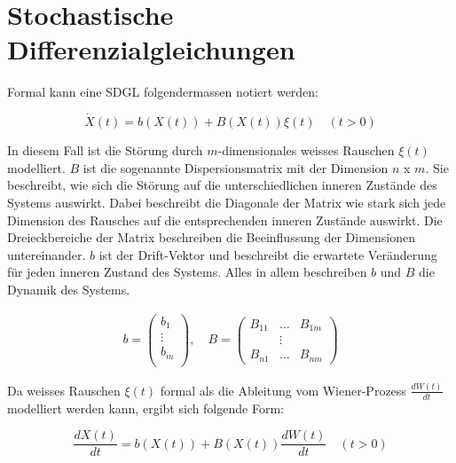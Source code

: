 %
%
%
%

\section{Stochastische Differenzialgleichungen\label{brown:SDGL}}

Formal kann eine SDGL folgendermassen notiert werden: 

\begin{equation}
	\label{brown:SDGL:whiteNoise}
	\dot{X}(t) = b(X(t)) + B(X(t))\xi(t) \quad (t>0)
\end{equation}

In diesem Fall ist die Störung durch $ m $-dimensionales weisses Rauschen $ \xi(t) $ modelliert. $ B $ ist die sogenannte Dispersionsmatrix mit der Dimension $ n $ x $ m $. Sie beschreibt, wie sich die Störung auf die unterschiedlichen inneren Zustände des Systems auswirkt. Dabei beschreibt die Diagonale der Matrix wie stark sich jede Dimension des Rausches auf die entsprechenden inneren Zustände auswirkt. Die Dreieckbereiche der Matrix beschreiben die Beeinflussung der Dimensionen untereinander. $ b $ ist der Drift-Vektor und beschreibt die erwartete Veränderung für jeden inneren Zustand des Systems. Alles in allem beschreiben $ b $ und $ B $ die Dynamik des Systems. 

\begin{align*}
	b = 
	\begin{pmatrix}
		b_{1} \\
		\vdots \\
		b_{m}\\ 
	\end{pmatrix}
	, \quad
	B = 
	\begin{pmatrix}
		B_{11} & \dots & B_{1m} \\
		& \vdots & \\
		B_{n1} & \dots & B_{nm} 
	\end{pmatrix}
\end{align*}


Da weisses Rauschen $ \xi(t) $ formal als die Ableitung vom Wiener-Prozess $ \frac{dW(t)}{dt} $ modelliert werden kann, ergibt sich folgende Form:

\begin{equation}
	\frac{dX(t)}{dt} = b(X(t)) + B(X(t)) \frac{dW(t)}{dt} \quad (t>0)
\end{equation}

